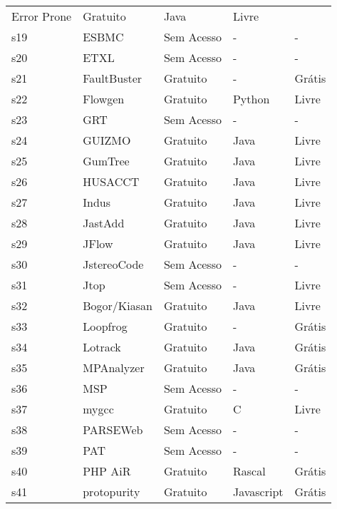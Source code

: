 \begin{longtable}{l l l l l}
      Error Prone &
      Gratuito &
      Java &
      Livre \\
    s19 &
      ESBMC &
      Sem Acesso &
      - &
      - \\
    s20 &
      ETXL &
      Sem Acesso &
      - &
      - \\
    s21 &
      FaultBuster &
      Gratuito &
      - &
      Grátis \\
    s22 &
      Flowgen &
      Gratuito &
      Python &
      Livre \\
    s23 &
      GRT &
      Sem Acesso &
      - &
      - \\
    s24 &
      GUIZMO &
      Gratuito &
      Java &
      Livre \\
    s25 &
      GumTree &
      Gratuito &
      Java &
      Livre \\
    s26 &
      HUSACCT &
      Gratuito &
      Java &
      Livre \\
    s27 &
      Indus &
      Gratuito &
      Java &
      Livre \\
    s28 &
      JastAdd &
      Gratuito &
      Java &
      Livre \\
    s29 &
      JFlow &
      Gratuito &
      Java &
      Livre \\
    s30 &
      JstereoCode &
      Sem Acesso &
      - &
      - \\
    s31 &
      Jtop &
      Sem Acesso &
      - &
      Livre \\
    s32 &
      Bogor/Kiasan &
      Gratuito &
      Java &
      Livre \\
    s33 &
      Loopfrog &
      Gratuito &
      - &
      Grátis \\
    s34 &
      Lotrack &
      Gratuito &
      Java &
      Grátis \\
    s35 &
      MPAnalyzer &
      Gratuito &
      Java &
      Grátis \\
    s36 &
      MSP &
      Sem Acesso &
      - &
      - \\
    s37 &
      mygcc &
      Gratuito &
      C &
      Livre \\
    s38 &
      PARSEWeb &
      Sem Acesso &
      - &
      - \\
    s39 &
      PAT &
      Sem Acesso &
      - &
      - \\
    s40 &
      PHP AiR &
      Gratuito &
      Rascal &
      Grátis \\
    s41 &
      protopurity &
      Gratuito &
      Javascript &
      Grátis \\

\end{longtable}
